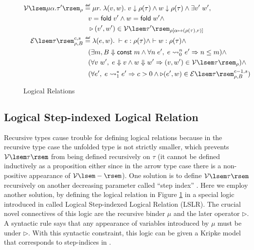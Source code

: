 \documentclass[preprint]{sigplanconf}
\newcommand{\symfold}{\mathsf{fold\;}}
\newcommand{\relV}[1]{\mathcal{V}\lsem#1\rsem}
\newcommand{\relE}[1]{\mathcal{E}\lsem#1\rsem}
\newcommand{\later}{\triangleright}
\newcommand\defeq{\mathrel{\overset{\makebox[0pt]{\mbox{\normalfont\tiny\sffamily def}}}{=}}}
\begin{document}
\begin{figure}
{\begin{align*}
  \relV{\mu\alpha.\tau'}_\rho &\defeq \mu r.\;\lambda (v,w).\; v \downarrow \rho(\tau) \wedge w \downarrow \rho(\tau) \wedge \exists v'\;w',\; \\
  & \hspace{.1in} v = \symfold v' \wedge w = \symfold w' \wedge \\
  & \hspace{.1in} \later (v',w') \in \relV{\tau'}_{\rho[\alpha\mapsto(\rho(\tau),r)]} \\
  \relE{\tau}^{c,s}_{\rho,B} &\defeq \lambda(e,w).\;\vdash e:\rho(\tau) \wedge \vdash w:\rho(\tau) \wedge \\
  & \hspace{.1in} (\exists m, B \Downarrow \mathsf{const}\;m \wedge \forall n\;e',\; e\leadsto^n_0 e' \Rightarrow n \leq m) \wedge \\
  & \hspace{.1in} (\forall v\;w',\; e\Downarrow v \wedge w\Downarrow w'\Rightarrow (v,w') \in \relV{\tau}_\rho) \wedge \\
  & \hspace{.1in} (\forall e',\; e\leadsto^*_1 e' \Rightarrow c > 0 \wedge \later (e',w)\in \relE{\tau}^{c-1,s}_{\rho,B})
\end{align*}
}
\caption{\label{lrel}Logical Relations}
\end{figure}

\subsection {Logical Step-indexed Logical Relation}
Recursive types cause trouble for defining logical relations because in the recursive type case the unfolded type is not strictly smaller, which prevents $\relV{\tau}$ from being defined recursively on $\tau$ (it cannot be defined inductively as a proposition either since in the arrow type case there is a non-positive appearance of $\relV{-}$). One solution is to define $\relV{\tau}$ recursively on another decreasing parameter called ``step index'' \cite{ahmed2006step}. Here we employ another solution, by defining the logical relation in Figure \ref{lrel} in a special logic introduced in \cite{dreyer2009logical} called Logical Step-indexed Logical Relation (LSLR). The crucial novel connectives of this logic are the recursive binder $\mu$ and the later operator $\later$. A syntactic rule says that any appearance of variables introduced by $\mu$ must be under $\later$. With this syntactic constraint, this logic can be given a Kripke model that corresponds to step-indices in \cite{ahmed2006step}. 
\end{document}
